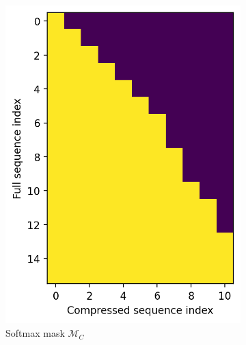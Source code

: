 \begin{figure}[!ht]
\begin{subfigure}[b]{0.39\columnwidth}
         \includegraphics[width=\linewidth]{sources/part_2/kv_cache/imgs/compressed_M_C_ex.png}
         \caption{Softmax mask $\mathcal{M}_C$}
    \end{subfigure}
    \begin{subfigure}[b]{0.48\columnwidth}

\end{subfigure}
\end{figure}

